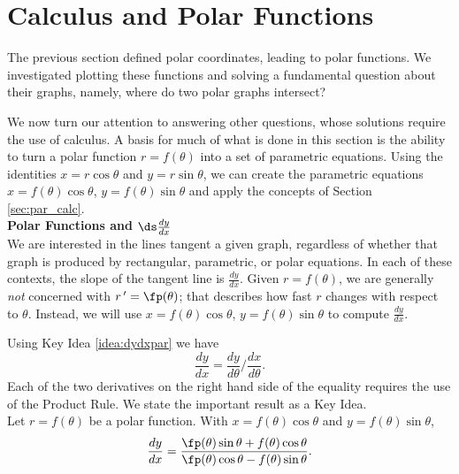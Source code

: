\section{Calculus and Polar Functions} \label{sec:polarcalc}
The previous section defined polar coordinates, leading to polar functions. We investigated plotting these functions and solving a fundamental question about their graphs, namely, where do two polar graphs intersect?

We now turn our attention to answering other questions, whose solutions require the use of calculus. A basis for much of what is done in this section is the ability to turn a polar function $r=f(\theta)$ into a set of parametric equations. Using the identities $x=r\cos \theta$ and $y=r\sin \theta$, we can create the parametric equations $x=f(\theta)\cos\theta$, $y=f(\theta)\sin\theta$ and apply the concepts of Section \ref{sec:par_calc}.\\

\noindent\textbf{\large Polar Functions and $\ds \frac{dy}{dx}$}\\

We are interested in the lines tangent a given graph, regardless of whether that graph is produced by rectangular, parametric, or polar equations. In each of these contexts, the slope of the tangent line is $\frac{dy}{dx}$. Given $r=f(\theta)$, we are generally \textit{not} concerned with $r\,'=\fp(\theta)$; that describes how fast $r$ changes with respect to $\theta$. Instead, we will use $x=f(\theta)\cos\theta$, $y=f(\theta)\sin\theta$ to compute $\frac{dy}{dx}$. 

Using Key Idea \ref{idea:dydxpar} we have $$\frac{dy}{dx} = \frac{dy}{d\theta}\Big/\frac{dx}{d\theta}.$$ Each of the two derivatives on the right hand side of the equality requires the use of the Product Rule. We state the important result as a Key Idea.\\

{Let $r=f(\theta)$ be a polar function. With $x=f(\theta)\cos\theta$ and $y=f(\theta)\sin\theta$,
$$\frac{dy}{dx} = \frac{\fp(\theta)\sin\theta+f(\theta)\cos\theta}{\fp(\theta)\cos\theta-f(\theta)\sin\theta}.$$
}

